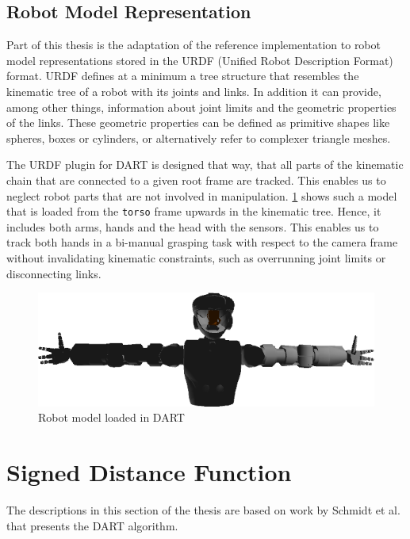 \subsection{Robot Model Representation}

Part of this thesis is the adaptation of the reference implementation to robot model representations stored in the URDF (Unified Robot Description Format) format. URDF defines at a minimum a tree structure that resembles the kinematic tree of a robot with its joints and links. In addition it can provide, among other things, information about joint limits and the geometric properties of the links. These geometric properties can be defined as primitive shapes like spheres, boxes or cylinders, or alternatively refer to complexer triangle meshes.

The URDF plugin for DART is designed that way, that all parts of the kinematic chain that are connected to a given root frame are tracked. This enables us to neglect robot parts that are not involved in manipulation. \cref{fig:val_model_dart} shows such a model that is loaded from the \texttt{torso} frame upwards in the kinematic tree. Hence, it includes both arms, hands and the head with the sensors. This enables us to track both hands in a bi-manual grasping task with respect to the camera frame without invalidating kinematic constraints, such as overrunning joint limits or disconnecting links.

\begin{figure}
\centering
\includegraphics[width=\textwidth]{images/valkyrie/val_model_torso_dart.png}
\caption{Robot model loaded in DART}
\label{fig:val_model_dart}
\end{figure}


\section{Signed Distance Function}

The descriptions in this section of the thesis are based on work by Schmidt et al. \cite{Schmidt2015} that presents the DART algorithm.


